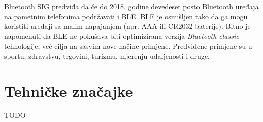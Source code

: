 Bluetooth SIG predviđa da će do 2018. godine devedeset posto Bluetooth uređaja na pametnim telefonima podržavati i BLE. 
BLE je osmišljen tako da ga mogu koristiti uređaji sa malim napajanjem (npr. AAA ili CR2032 baterije). 
Bitno je napomenuti da BLE ne pokušava biti optimizirana verzija \textit{Bluetooth classic} tehnologije, već cilja na sasvim nove načine primjene.  
Predviđene primjene su u sportu, zdravstvu, trgovini, turizmu, mjerenju udaljenosti i druge. 


\section*{Tehničke značajke}

TODO